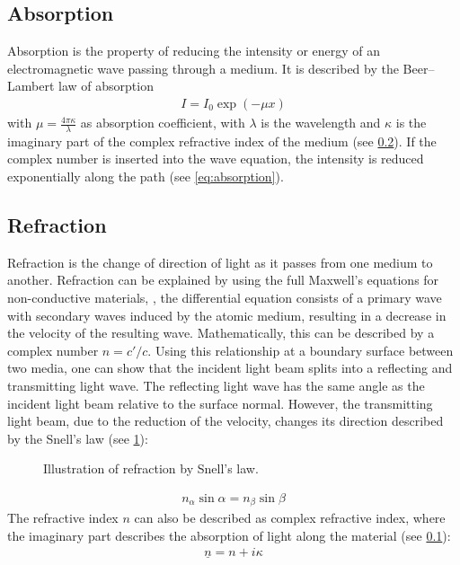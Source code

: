 \subsection{Absorption}\label{sec:theoAbsorption}
%
Absorption is the property of reducing the intensity or energy of an electromagnetic wave passing through a medium.
It is described by the Beer–Lambert law of absorption
%
\begin{align}
    I = I_0 \exp(-\mu x) \label{eq:absorption}
\end{align}
%
with $\mu = \frac{4\pi \kappa}{\lambda}$ as absorption coefficient, with $\lambda$ is the wavelength and $\kappa$ is the imaginary part of the complex refractive index of the medium (see \cref{sec:theoRefraction}).
If the complex number is inserted into the wave equation, the intensity is reduced exponentially along the path (see \cref{eq:absorption}).
%
%
%
\subsection{Refraction}\label{sec:theoRefraction}
%
Refraction is the change of direction of light as it passes from one medium to another.
Refraction can be explained by using the full Maxwell's equations for non-conductive materials,
\ie{}, the differential equation consists of a primary wave with secondary waves induced by the atomic medium, resulting in a decrease in the velocity of the resulting wave.
Mathematically, this can be described by a complex number $n = c' / c$.
Using this relationship at a boundary surface between two media, one can show that the incident light beam splits into a reflecting and transmitting light wave.
The reflecting light wave has the same angle as the incident light beam relative to the surface normal.
%
However, the transmitting light beam, due to the reduction of the velocity, changes its direction described by the Snell's law (see \cref{fig:optic_refraction}):
%
\begin{figure}[!t]
\centering
\setlength{\tikzwidth}{\textwidth}
\caption[]{Illustration of refraction by Snell's law.}
\label{fig:optic_refraction}
\end{figure}
%
\begin{align}
    n_\alpha \sin \alpha = n_\beta \sin \beta \label{eq:Snellius}
\end{align}
%
The refractive index $n$ can also be described as complex refractive index, where the imaginary part describes the absorption of light along the material (see \cref{sec:theoAbsorption}):
%
\begin{align}
\underline{n} = n + i\kappa
\end{align}
%
%
%
